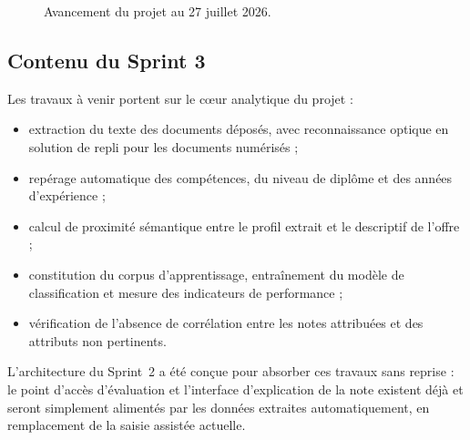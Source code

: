 \documentclass[11pt,a4paper]{article}
\begin{document}
\begin{figure}[H]
  \centering
  \caption{Avancement du projet au 27 juillet 2026.}
  \label{fig:gantt2}
\end{figure}

\subsection{Contenu du Sprint 3}
Les travaux à venir portent sur le cœur analytique du projet :
\begin{itemize}[leftmargin=1.5em, nosep]
  \item extraction du texte des documents déposés, avec reconnaissance optique en solution de repli pour les documents numérisés ;
  \item repérage automatique des compétences, du niveau de diplôme et des années d'expérience ;
  \item calcul de proximité sémantique entre le profil extrait et le descriptif de l'offre ;
  \item constitution du corpus d'apprentissage, entraînement du modèle de classification et mesure des indicateurs de performance ;
  \item vérification de l'absence de corrélation entre les notes attribuées et des attributs non pertinents.
\end{itemize}

\noindent L'architecture du Sprint~2 a été conçue pour absorber ces travaux sans reprise : le point d'accès d'évaluation et l'interface d'explication de la note existent déjà et seront simplement alimentés par les données extraites automatiquement, en remplacement de la saisie assistée actuelle.
\end{document}

